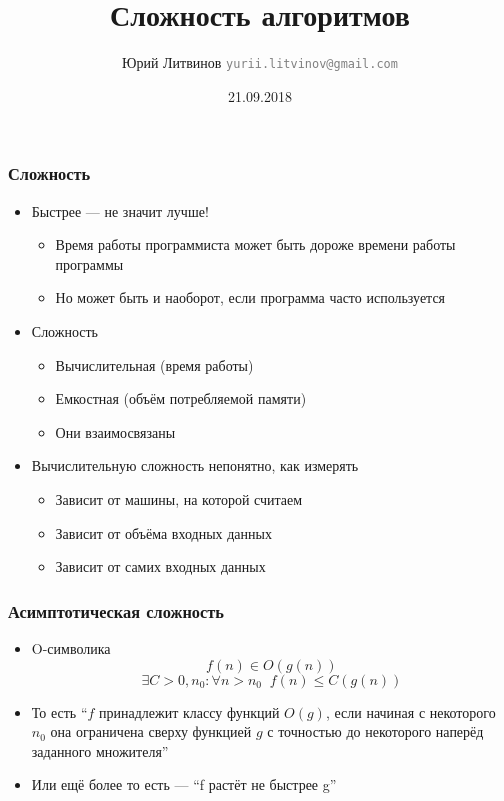 \documentclass[xetex,mathserif,serif]{beamer}
\title{Сложность алгоритмов}
\author[Юрий Литвинов]{Юрий Литвинов \newline \textcolor{gray}{\small\texttt{yurii.litvinov@gmail.com}}}
\date{21.09.2018}
\begin{document}
	
	\frame{\titlepage}
	
	\begin{frame}
		\frametitle{Сложность}
		\begin{itemize}
			\item Быстрее --- не значит лучше!
			\begin{itemize}
				\item Время работы программиста может быть дороже времени работы программы
				\item Но может быть и наоборот, если программа часто используется
			\end{itemize}
			\item Сложность
			\begin{itemize}
				\item Вычислительная (время работы)
				\item Емкостная (объём потребляемой памяти)
				\item Они взаимосвязаны
			\end{itemize}
			\item Вычислительную сложность непонятно, как измерять
			\begin{itemize}
				\item Зависит от машины, на которой считаем
				\item Зависит от объёма входных данных
				\item Зависит от самих входных данных
			\end{itemize}
		\end{itemize}
	\end{frame}

	\begin{frame}
		\frametitle{Асимптотическая сложность}
		\begin{itemize}
			\item O-символика
			$$f(n) \in O(g(n))$$
			$$\exists C > 0, n_0 : \forall n > n_0\;\; f(n) \leq C(g(n))$$
			\item То есть ``$f$ принадлежит классу функций $O(g)$, если начиная с некоторого $n_0$ она ограничена сверху функцией $g$ с точностью до некоторого наперёд заданного множителя''
			\item Или ещё более то есть --- ``f растёт не быстрее g''
		\end{itemize}
	\end{frame}
\end{document}
